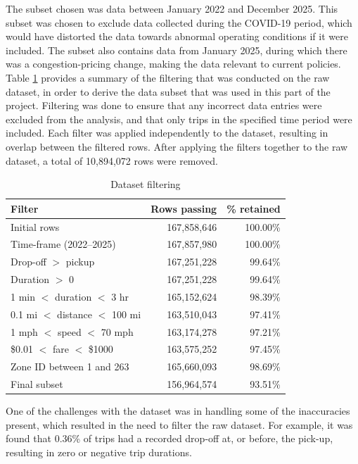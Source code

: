 \documentclass[conference]{IEEEtran}
\begin{document}
The subset chosen was data between January  2022 and December 2025. This subset was chosen to exclude data collected during the COVID-19 period, which would have distorted the data towards abnormal operating conditions if it were included. The subset also contains data from January 2025, during which there was a congestion-pricing change, making the data relevant to current policies. \\

Table \ref{tab:data-filtering} provides a summary of the filtering that was conducted on the raw dataset, in order to derive the data subset that was used in this part of the project. Filtering was done to ensure that any incorrect data entries were excluded from the analysis, and that only trips in the specified time period were included. Each filter was applied independently to the dataset, resulting in overlap between the filtered rows. After applying the filters together to the raw dataset, a total of 10,894,072 rows were removed. \\

\begin{table}[b]
\centering
\footnotesize
\caption{Dataset filtering}
\label{tab:data-filtering}
\begin{tabular}{lrr}\toprule
Filter & Rows passing & \% retained \\\midrule
Initial rows & 167,858,646 & 100.00\% \\
Time-frame (2022--2025) & 167,857,980 & 100.00\% \\
Drop-off $>$ pickup & 167,251,228 & 99.64\% \\
Duration $>$ 0 & 167,251,228 & 99.64\% \\
1 min $<$ duration $<$ 3 hr & 165,152,624 & 98.39\% \\
0.1 mi $<$ distance $<$ 100 mi & 163,510,043 & 97.41\% \\
1 mph $<$ speed $<$ 70 mph & 163,174,278 & 97.21\% \\
\$0.01 $<$ fare $<$ \$1000 & 163,575,252 & 97.45\% \\
Zone ID between 1 and 263 & 165,660,093 & 98.69\% \\\midrule
Final subset & 156,964,574 & 93.51\% \\\bottomrule
\end{tabular}
\end{table}

One of the challenges with the dataset was in handling some of the inaccuracies present, which resulted in the need to filter the raw dataset. For example, it was found that 0.36\% of trips had a recorded drop-off at, or before, the pick-up, resulting in zero or negative trip durations.  \\
\end{document}
